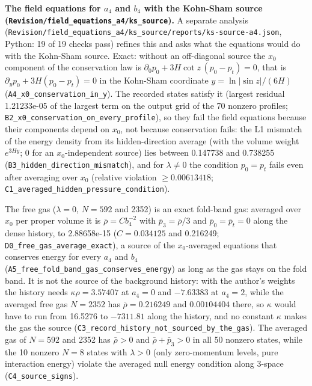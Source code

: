 \documentclass[11pt]{article}
\begin{document}
\textbf{The field equations for $a_4$ and $b_4$ with the Kohn-Sham source (\texttt{Revision\allowbreak{}/field\_e\allowbreak{}quations\allowbreak{}\_a4/ks\_s\allowbreak{}ource}).} A separate analysis (\texttt{Revision\allowbreak{}/field\_e\allowbreak{}quations\allowbreak{}\_a4/ks\_s\allowbreak{}ource/re\allowbreak{}ports/ks\allowbreak{}-source-\allowbreak{}a4.json}, Python: 19 of 19 checks pass) refines this and asks what the equations would do with the Kohn-Sham source. Exact: without an off-diagonal source the $x_0$ component of the conservation law is $\partial_0 p_0 + 3H\cot z\,(p_0 - p_t) = 0$, that is $\partial_y p_0 + 3H(p_0 - p_t) = 0$ in the Kohn-Sham coordinate $y = \ln|\sin z|/(6H)$ (\texttt{A4\_x0\_co\allowbreak{}nservati\allowbreak{}on\_in\_y}). The recorded states satisfy it (largest residual 1.21233e-05 of the largest term on the output grid of the 70 nonzero profiles; \texttt{B2\_x0\_co\allowbreak{}nservati\allowbreak{}on\_on\_ev\allowbreak{}ery\_prof\allowbreak{}ile}), so they fail the field equations because their components depend on $x_0$, not because conservation fails: the L1 mismatch of the energy density from its hidden-direction average (with the volume weight $e^{3Hy}$; 0 for an $x_0$-independent source) lies between 0.147738 and 0.738255 (\texttt{B3\_hidde\allowbreak{}n\_direct\allowbreak{}ion\_mism\allowbreak{}atch}), and for $\lambda \neq 0$ the condition $p_0 = p_t$ fails even after averaging over $x_0$ (relative violation $\geq 0.00613418$; \texttt{C1\_avera\allowbreak{}ged\_hidd\allowbreak{}en\_press\allowbreak{}ure\_cond\allowbreak{}ition}).

The free gas ($\lambda = 0$, $N = 592$ and 2352) is an exact fold-band gas: averaged over $x_0$ per proper volume it is $\bar\rho = Cb_4^{-2}$ with $\bar p_3 = \bar\rho/3$ and $\bar p_0 = \bar p_t = 0$ along the dense history, to 2.88658e-15 ($C = 0.034125$ and 0.216249; \texttt{D0\_free\_\allowbreak{}gas\_aver\allowbreak{}age\_exac\allowbreak{}t}), a source of the $x_0$-averaged equations that conserves energy for every $a_4$ and $b_4$ (\texttt{A5\_free\_\allowbreak{}fold\_ban\allowbreak{}d\_gas\_co\allowbreak{}nserves\_\allowbreak{}energy}) as long as the gas stays on the fold band. It is not the source of the background history: with the author's weights the history needs $\kappa\rho = 3.57407$ at $a_4 = 0$ and $-7.63383$ at $a_4 = 2$, while the averaged free gas $N = 2352$ has $\bar\rho = 0.216249$ and $0.00104404$ there, so $\kappa$ would have to run from 16.5276 to $-7311.81$ along the history, and no constant $\kappa$ makes the gas the source (\texttt{C3\_recor\allowbreak{}d\_histor\allowbreak{}y\_not\_so\allowbreak{}urced\_by\allowbreak{}\_the\_gas}). The averaged gas of $N = 592$ and 2352 has $\bar\rho > 0$ and $\bar\rho + \bar p_3 > 0$ in all 50 nonzero states, while the 10 nonzero $N = 8$ states with $\lambda > 0$ (only zero-momentum levels, pure interaction energy) violate the averaged null energy condition along 3-space (\texttt{C4\_sourc\allowbreak{}e\_signs}).
\end{document}

